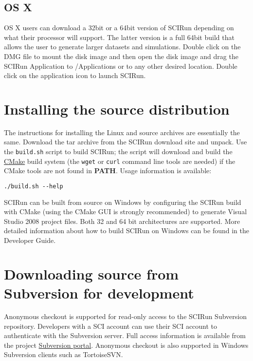 \documentclass[fleqn,12pt,openany]{book}
\begin{document}
\subsection{OS X}

OS X users can download a 32bit or a 64bit version of SCIRun depending on what their processor will support.
The latter version is a full 64bit build that allows the user to generate larger datasets and simulations.
Double click on the DMG file to mount the disk image and then open the disk image and drag the SCIRun Application to /Applications or to any other desired location.
Double click on the application icon to launch SCIRun.

\section{Installing the source distribution}

The instructions for installing the Linux and source archives are essentially the same.
Download the tar archive from the SCIRun download site and unpack.
Use the \texttt{build.sh} script to build SCIRun; the script will download and build the
\href{http://www.cmake.org}{CMake} build system (the \texttt{wget} or \texttt{curl} command line tools are needed)
if the CMake tools are not found in \textbf{PATH}.
Usage information is available:
\begin{verbatim}
./build.sh --help
\end{verbatim}

SCIRun can be built from source on Windows by configuring the SCIRun build with CMake (using the
CMake GUI is strongly recommended) to generate Visual Studio 2008 project files.
Both 32 and 64 bit architectures are supported.
More detailed information about how to build SCIRun on Windows can be found in the Developer Guide.

\section{Downloading source from Subversion for development}\label{sec:dev}

Anonymous checkout is supported for read-only access to the SCIRun Subversion repository.
Developers with a SCI account can use their SCI account to authenticate with the Subversion server.
Full access information is available from the project
\href{https://gforge.sci.utah.edu/gf/project/cibc/scmsvn/?action=AccessInfo}{Subversion portal}.
Anonymous checkout is also supported in Windows Subversion clients such as TortoiseSVN.
\end{document}
